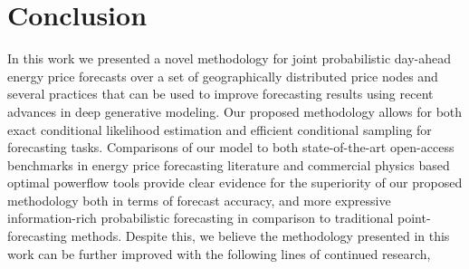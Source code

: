 \chapter{Conclusion}\label{ch:conclusion}

In this work we presented a novel methodology for joint probabilistic day-ahead energy price forecasts over a set of
geographically distributed price nodes and several practices that can be used to improve forecasting results using
recent advances in deep generative modeling.
Our proposed methodology allows for both exact conditional likelihood estimation and efficient conditional sampling for
forecasting tasks.
Comparisons of our model to both state-of-the-art open-access benchmarks in energy price forecasting literature and
commercial physics based optimal powerflow tools provide clear evidence for the superiority of our proposed methodology
both in terms of forecast accuracy, and more expressive information-rich probabilistic forecasting in comparison to
traditional point-forecasting methods.
Despite this, we believe the methodology presented in this work can be further improved with the following
lines of continued research,

